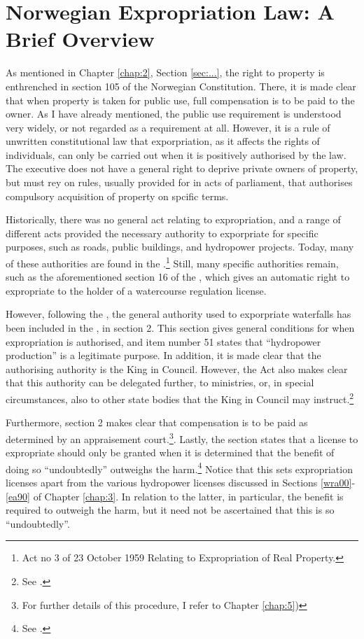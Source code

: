 \section{Norwegian Expropriation Law: A Brief Overview}

As mentioned in Chapter \ref{chap:2}, Section \ref{sec:...}, the right to property is enthrenched in section 105 of the Norwegian Constitution. There, it is made clear that when property is taken for public use, full compensation is to be paid to the owner. As I have already mentioned, the public use requirement is understood very widely, or not regarded as a requirement at all. However, it is a rule of unwritten constitutional law that exporpriation, as it affects the rights of individuals, can only be carried out when it is positively authorised by the law. The executive does not have a general right to deprive private owners of property, but must rey on rules, usually provided for in acts of parliament, that authorises compulsory acquisition of property on spcific terms.  

Historically, there was no general act relating to expropriation, and a range of different acts provided the necessary authority to exporpriate for specific purposes, such as roads, public buildings, and hydropower projects. Today, many of these authorities are found in the \cite{ea59}.\footnote{Act no 3 of 23 October 1959 Relating to Expropriation of Real Property.} Still, many specific authorities remain, such as the aforementioned section 16 of the \cite{wra17}, which gives an automatic right to expropriate to the holder of a watercourse regulation license.

However, following the \cite{wra00}, the general authority used to exporpriate waterfalls has been included in the \cite{ea59}, in section 2. This section gives general conditions for when expropriation is authorised, and item number 51 states that ``hydropower production'' is a legitimate purpose. In addition, it is made clear that the authorising authority is the King in Council. However, the Act also makes clear that this authority can be delegated further, to ministries, or, in special circumstances, also to other state bodies that the King in Council may instruct.\footnote{See \cite[5]{ea59}.} 

Furthermore, section 2 makes clear that compensation is to be paid as determined by an appraisement court.\footnote{For further details of this procedure, I refer to Chapter \ref{chap:5})}. Lastly, the section states that a license to expropriate should only be granted when it is determined that the benefit of doing so ``undoubtedly'' outweighs the harm.\footnote{See \cite[2]{ea59}.} Notice that this sets expropriation licenses apart from the various hydropower licenses discussed in Sections \ref{wra00}-\ref{ea90} of Chapter \ref{chap:3}. In relation to the latter, in particular, the benefit is required to outweigh the harm, but it need not be ascertained that this is so ``undoubtedly''.

